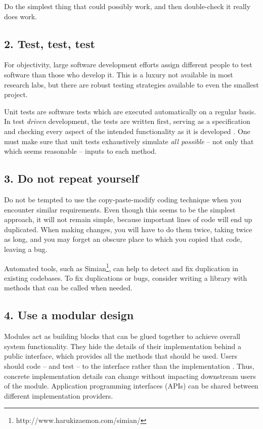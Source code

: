 \documentclass{bmcart}
\begin{document}
Do the simplest thing that could possibly work, and then double-check it really does work. 

\subsection*{2. Test, test, test}

For objectivity, large software development efforts assign different people to test software than those who develop it. This is a luxury not available in most research labs, but there are robust testing strategies available to even the smallest project. 

Unit tests are software tests which are executed automatically on a regular basis. In test \textit{driven} development, the tests are written first, serving as a specification and checking every aspect of the intended functionality as it is developed \cite{tdd}. One must make sure that unit tests exhaustively simulate \textit{all possible} -- not only that which seems reasonable -- inputs to each method. 

\subsection*{3. Do not repeat yourself}

Do not be tempted to use the copy-paste-modify coding technique when you encounter similar requirements. Even though this seems to be the simplest approach, it will not remain simple, because important lines of code will end up duplicated. When making changes, you will have to do them twice, taking twice as long, and you may forget an obscure place to which you copied that code, leaving a bug. 

Automated tools, such as Simian\footnote{http://www.harukizaemon.com/simian/}, can help to detect and fix duplication in existing codebases. To fix duplications or bugs, consider writing a library with methods that can be called when needed.  

\subsection*{4. Use a modular design}

Modules act as building blocks that can be glued together to achieve overall system functionality. They hide the details of their implementation behind a public interface, which provides all the methods that should be used. Users should code -- and test -- to the interface rather than the implementation \cite{effectivejava2008}. Thus, concrete implementation details can change without impacting downstream users of the module. Application programming interfaces (APIs) can be shared between different implementation providers. 
\end{document}

